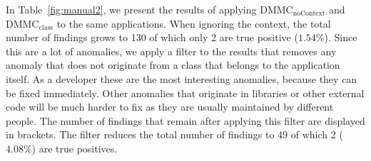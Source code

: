 \begin{table}[t]
    \centering
    \caption{Comparison of $\text{DMMC}_\text{noContext}$ and $\text{DMMC}_\text{class}$. The numbers in brackets indicate findings on the project itself.}\label{fig:manual2}
\end{table}

In Table~\ref{fig:manual2}, we present the results of applying $\text{DMMC}_\text{noContext}$ and $\text{DMMC}_\text{class}$ to the same applications.
When ignoring the context, the total number of findings grows to 130 of which only 2 are true positive ($1.54\%$).
Since this are a lot of anomalies, we apply a filter to the results that removes any anomaly that does not originate from a class that belongs to the application itself.
As a developer these are the most interesting anomalies, because they can be fixed immediately.
Other anomalies that originate in libraries or other external code will be much harder to fix as they are usually maintained by different people.
The number of findings that remain after applying this filter are displayed in brackets.
The filter reduces the total number of findings to 49 of which 2 ($4.08\%$) are true positives.

